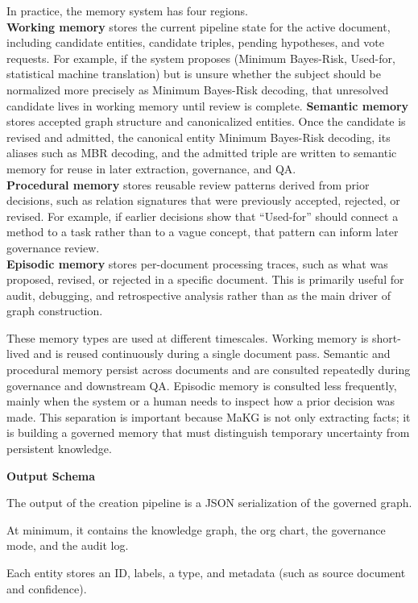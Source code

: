 In practice, the memory system has four regions.\\
\textbf{Working memory} stores the current pipeline state for the active
document, including candidate entities, candidate triples, pending
hypotheses, and vote requests. For example, if the system proposes
(Minimum Bayes-Risk, Used-for, statistical machine translation) but is
unsure whether the subject should be normalized more precisely as
Minimum Bayes-Risk decoding, that unresolved candidate lives in working
memory until review is complete. \textbf{Semantic memory} stores
accepted graph structure and canonicalized entities. Once the candidate
is revised and admitted, the canonical entity Minimum Bayes-Risk
decoding, its aliases such as MBR decoding, and the admitted triple are
written to semantic memory for reuse in later extraction, governance,
and QA.\\
\textbf{Procedural memory} stores reusable review patterns derived from
prior decisions, such as relation signatures that were previously
accepted, rejected, or revised. For example, if earlier decisions show
that ``Used-for'' should connect a method to a task rather than to a
vague concept, that pattern can inform later governance review.\\
\textbf{Episodic memory} stores per-document processing traces, such as
what was proposed, revised, or rejected in a specific document. This is
primarily useful for audit, debugging, and retrospective analysis rather
than as the main driver of graph construction.

These memory types are used at different timescales. Working memory is
short-lived and is reused continuously during a single document pass.
Semantic and procedural memory persist across documents and are
consulted repeatedly during governance and downstream QA. Episodic
memory is consulted less frequently, mainly when the system or a human
needs to inspect how a prior decision was made. This separation is
important because MaKG is not only extracting facts; it is building a
governed memory that must distinguish temporary uncertainty from
persistent knowledge.

\textbf{Output Schema}

The output of the creation pipeline is a JSON serialization of the
governed graph.

At minimum, it contains the knowledge graph, the org chart, the
governance mode, and the audit log.

Each entity stores an ID, labels, a type, and metadata (such as source
document and confidence).

